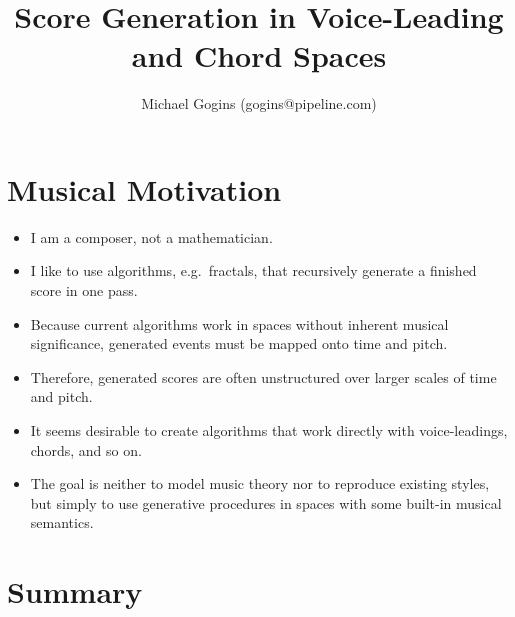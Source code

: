 \documentclass[14pt,letterpaper,onecolumn]{scrartcl}
\begin{document}
\setcounter{tocdepth}{2}
{}

\title{Score Generation in Voice-Leading and Chord Spaces}
\author{
Michael Gogins  (gogins@pipeline.com)
}
\maketitle

\section{Musical Motivation}

\begin{itemize}
	
\item I am a composer, not a mathematician.

\item I like to use algorithms, e.g.\ fractals, that recursively generate a finished score in one pass.

\item Because current algorithms work in spaces without inherent musical significance, generated events must be mapped onto time and pitch.

\item Therefore, generated scores are often unstructured over larger scales of time and pitch.

\item It seems desirable to create algorithms that work directly with voice-leadings, chords, and so on.

\item The goal is neither to model music theory nor to reproduce existing styles, but simply to use generative procedures in spaces with some built-in musical semantics.

\end{itemize}

\section{Summary}
\end{document}
